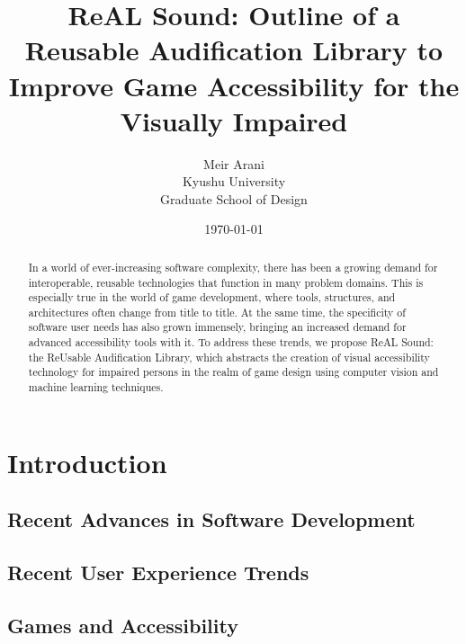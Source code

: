 \documentclass{report}
\begin{document}

\author{Meir Arani \\ Kyushu University \\ Graduate School of Design} %
\title{ReAL Sound: Outline of a Reusable Audification Library to Improve Game Accessibility for the Visually Impaired} 
\date{\today{}} 
\maketitle{} 


\begin{abstract}
    In a world of ever-increasing software complexity, there has been a growing demand for interoperable, reusable technologies that function in many problem domains. This is especially true in the world of game development, where tools, structures, and architectures often change from title to title. At the same time, the specificity of software user needs has also grown immensely, bringing an increased demand for advanced accessibility tools with it. To address these trends, we propose ReAL Sound: the ReUsable Audification Library, which abstracts the creation of visual accessibility technology for impaired persons in the realm of game design using computer vision and machine learning techniques.  
\end{abstract}

\newpage{} %


\tableofcontents{} %
\newpage{} %



\chapter{Introduction}
\section{Recent Advances in Software Development}
\section{Recent User Experience Trends}
\section{Games and Accessibility}
\end{document}
